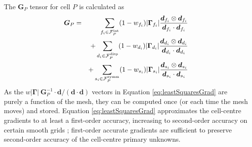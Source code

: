 \documentclass[sn-mathphys,Numbered]{sn-jnl}%
\newcommand{\bb}{\boldsymbol}
\begin{document}
The $\bb{G}_P$ tensor for cell $P$ is calculated as
\begin{eqnarray}
	 \bb{G}_P &=&
	 \sum_{{f_i} \in \mathcal{F}^{\text{int}}_P} (1 - w_{f_i}) |\bb{\Gamma}_{f_i}|  \frac{\bb{d}_{f_i} \otimes \bb{d}_{f_i}}{\bb{d}_{f_i} \cdot \bb{d}_{f_i}} \notag \\
	 &&+  \sum_{{d_i} \in \mathcal{F}^{\text{disp}}_P} (1 - w_{d_i}) |\bb{\Gamma}_{d_i}|  \frac{\bb{d}_{d_i} \otimes \bb{d}_{d_i}}{\bb{d}_{d_i} \cdot \bb{d}_{d_i}} \notag \\
	 && +  \sum_{{s_i} \in \mathcal{F}^{\text{symm}}_P} (1 - w_{s_i}) |\bb{\Gamma}_{s_i}|  \frac{\bb{d}_{s_i} \otimes \bb{d}_{s_i}}{\bb{d}_{s_i} \cdot \bb{d}_{s_i}}
\end{eqnarray}
As the $w |\bb{\Gamma}| \ \bb{G}^{-1}_P \cdot \bb{d}/(\bb{d}\cdot \bb{d})$ vectors in Equation \ref{eq:leastSquaresGrad} are purely a function of the mesh, they can be computed once (or each time the mesh moves) and stored.
Equation \ref{eq:leastSquaresGrad} approximates the cell-centre gradients to at least a first-order accuracy, increasing to second-order accuracy on certain smooth grids \citep{Syrakos2023};
first-order accurate gradients are sufficient to preserve second-order accuracy of the cell-centre primary unknowns.



\end{document}
